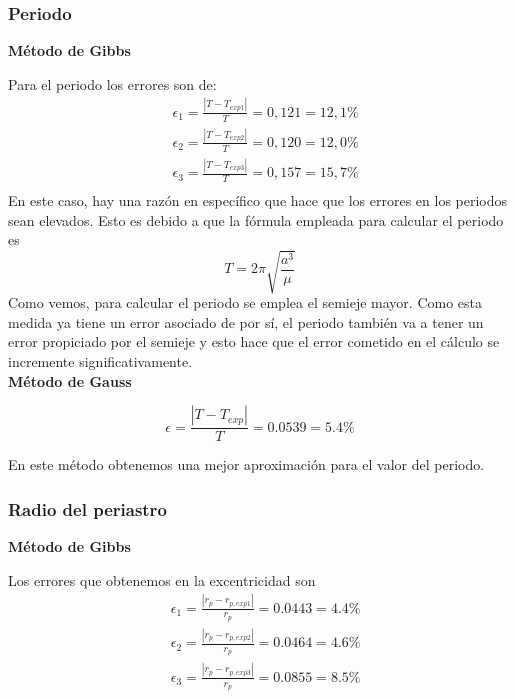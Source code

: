 \documentclass{article}
\numberwithin{equation}{section}
\begin{document}
\subsubsection{Periodo}
\noindent\textbf{Método de Gibbs}\par
Para el periodo los errores son de:
\begin{align*}
    &\epsilon_{1}=\frac{\left\lvert T-T_{exp1} \right\rvert }{T}=0,121=12,1\% \\
    &\epsilon_{2}=\frac{\left\lvert T-T_{exp2} \right\rvert }{T}=0,120=12,0\% \\
    &\epsilon_{3}=\frac{\left\lvert T-T_{exp3} \right\rvert }{T}=0,157=15,7\% \\
\end{align*}
En este caso, hay una razón en específico que hace que los 
errores en los periodos sean elevados. Esto es debido a que 
la fórmula empleada para calcular el periodo es 
\begin{equation*}
    T=2\pi\sqrt{\frac{a^{3}}{\mu}}
\end{equation*}
Como vemos, para calcular el periodo se emplea el semieje mayor. 
Como esta medida ya tiene un error asociado de por sí, el 
periodo también va a tener un error propiciado por el 
semieje y esto hace que el error cometido en el cálculo 
se incremente significativamente.\\

\noindent\textbf{Método de Gauss}\par

\begin{equation*}
    \epsilon=\frac{\left\lvert T-T_{exp} \right\rvert}{T}=0.0539=5.4\%
\end{equation*}

En este método obtenemos una mejor aproximación para el valor del periodo.


\subsubsection{Radio del periastro}
\noindent\textbf{Método de Gibbs}\par
Los errores que obtenemos en la excentricidad son 
\begin{align*}
    &\epsilon_{1}=\frac{\left\lvert r_p-r_{p,exp1} \right\rvert }{r_p}=0.0443=4.4\% \\
    &\epsilon_{2}=\frac{\left\lvert r_p-r_{p,exp2} \right\rvert }{r_p}=0.0464=4.6\% \\
    &\epsilon_{3}=\frac{\left\lvert r_p-r_{p,exp3} \right\rvert }{r_p}=0.0855=8.5\% \\
\end{align*}
\end{document}

